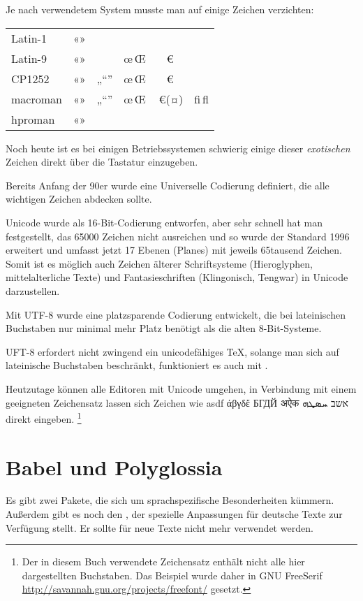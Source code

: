 Je nach verwendetem System musste man auf einige Zeichen verzichten:

\begin{tabular}{lccccc}
    Latin-1		& «» 	& 		&	&	&	\\
    Latin-9		& «» 	&		& œ\,Œ	& €	&	\\
    CP1252		& «» 	& „“”	& œ\,Œ	& €	&	\\
    macroman	& «» 	& „“”	& œ\,Œ	& €(¤)	& ﬁ\,ﬂ	\\
    hproman		& «» 	& 		&	&	&	\\
\end{tabular}

Noch heute ist es bei einigen Betriebssystemen schwierig einige dieser 
\emph{exotischen} Zeichen direkt über die Tastatur einzugeben.

Bereits Anfang der 90er wurde eine Universelle Codierung definiert,
die alle wichtigen Zeichen abdecken sollte.

Unicode wurde als 16-Bit-Codierung entworfen, aber sehr schnell hat man festgestellt,
das 65000 Zeichen nicht ausreichen und so wurde der Standard 1996
erweitert und umfasst jetzt 17 Ebenen (Planes) mit jeweils 65tausend
Zeichen. Somit ist es möglich auch Zeichen älterer Schriftsysteme
(Hieroglyphen, mittelalterliche Texte) und Fantasieschriften (Klingonisch,
Tengwar) in Unicode darzustellen.

Mit UTF-8 wurde eine platzsparende Codierung entwickelt, die bei lateinischen Buchstaben
nur minimal mehr Platz benötigt als die alten 8-Bit-Systeme.

UFT-8 erfordert nicht zwingend ein unicodefähiges \TeX{}, solange man sich auf
lateinische Buchstaben beschränkt, funktioniert es auch mit \pdfTeX{}.

Heutzutage können alle Editoren mit Unicode umgehen, in Verbindung mit einem geeigneten
Zeichensatz lassen sich Zeichen wie {\FSEfont asdf άβγδἔ БГДЙ अऐक אשב ܚܤܜܗ} direkt eingeben.%
\footnote{Der in diesem Buch verwendete Zeichensatz enthält nicht alle hier dargestellten Buchstaben.
Das Beispiel wurde daher in GNU FreeSerif \url{http://savannah.gnu.org/projects/freefont/} gesetzt.}

\section{Babel und Polyglossia}
Es gibt zwei Pakete, die sich um sprachspezifische Besonderheiten kümmern.
Außerdem gibt es noch den , der spezielle Anpassungen für deutsche Texte
zur Verfügung stellt. Er sollte für neue Texte nicht mehr verwendet werden.

